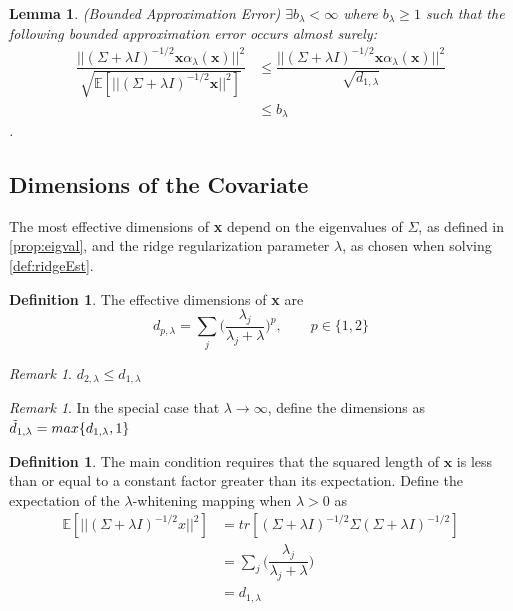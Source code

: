 \documentclass[nohyperref]{article}
\theoremstyle{plain}
\newtheorem{lemma}[theorem]{Lemma}
\theoremstyle{definition}
\newtheorem{definition}[theorem]{Definition}
\theoremstyle{remark}
\newtheorem{remark}[theorem]{Remark}
\begin{document}
\begin{lemma}
\label{lem:boundedApproxError}
(Bounded Approximation Error) $\exists b_{\lambda} < \infty$ where $b_{\lambda} \geq 1$ such that the following bounded approximation error occurs almost surely:
\begin{align*}
    \dfrac{||(\Sigma + \lambda I)^{-1/2}\textbf{x}\alpha_{\lambda}(\textbf{x})||^2}{\sqrt{\mathbb{E}[||(\Sigma + \lambda I)^{-1/2}\textbf{x}||^2]}} &\leq \dfrac{||(\Sigma + \lambda I)^{-1/2}\textbf{x}\alpha_{\lambda}(\textbf{x})||^2}{\sqrt{d_{1, \lambda}}} \\
    &\leq b_{\lambda}
\end{align*}
\cite{HKZ2014}.
\end{lemma}



\subsection{Dimensions of the Covariate}

The most effective dimensions of \textbf{x} depend on the eigenvalues of $\Sigma$, as defined in \cref{prop:eigval}, and the ridge regularization parameter $\lambda$, as chosen when solving \cref{def:ridgeEst}. 

\begin{definition}
\label{def:dimensions}
The effective dimensions of \textbf{x} are
$$d_{p, \lambda} = \sum_j \bigg( \dfrac{\lambda_j}{\lambda_j + \lambda} \bigg)^p, \qquad p \in \{1, 2\}$$
\end{definition}

\begin{remark}
$d_{2, \lambda} \leq d_{1, \lambda}$
\end{remark}

\begin{remark}
In the special case that $\lambda \longrightarrow \infty$, define the dimensions as $\Tilde{d}_{1, \lambda} = max\{d_{1, \lambda}, 1\}$
\end{remark}

\begin{definition}
\label{def:whitening}
The main condition requires that the squared length of $\textbf{x}$ is less
than or equal to a constant factor greater than its expectation. Define the expectation of the $\lambda$-whitening mapping when $\lambda > 0$ as 
\begin{align*}
    \mathbb{E}[||(\Sigma + \lambda I)^{-1/2}x||^2] &= tr[(\Sigma + \lambda I)^{-1/2} \Sigma (\Sigma + \lambda I)^{-1/2}] \\
    &= \sum_j \bigg( \dfrac{\lambda_j}{\lambda_j + \lambda} \bigg) \\
    &= d_{1, \lambda}
\end{align*}
\end{definition}
\end{document}
